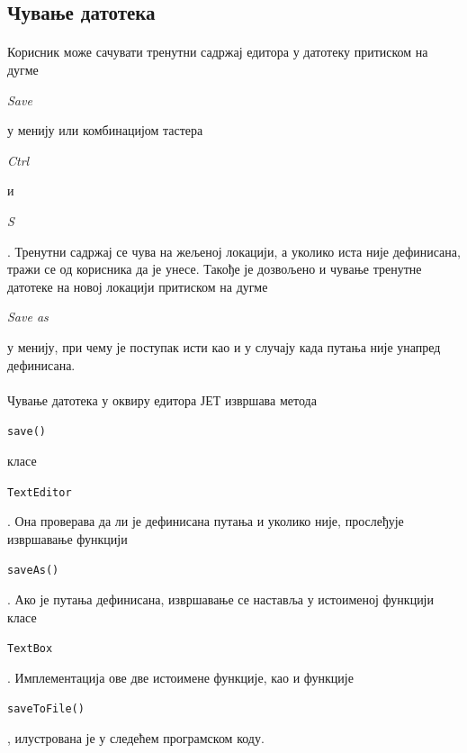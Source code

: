 \documentclass[12pt,oneside]{memoir}
\begin{document}
\subsection{Чување датотека}
\paragraph{}
Корисник може сачувати тренутни садржај едитора у датотеку притиском на дугме 
\begin{latinica}\textit{Save}\end{latinica} у менију или комбинацијом
тастера \begin{latinica}\textit{Ctrl}\end{latinica} и
\begin{latinica}\textit{S}\end{latinica}. Тренутни садржај се чува на 
жељеној локацији, а уколико иста није дефинисана, тражи се од корисника
да је унесе. Такође је дозвољено и чување тренутне датотеке на новој локацији
притиском на дугме \begin{latinica}\textit{Save as}\end{latinica} у менију, при
чему је поступак исти као и у случају када путања није унапред дефинисана.

\paragraph{}
Чување датотека у оквиру едитора ЈЕТ извршава метода
\begin{latinica}\verb|save()|\end{latinica} класе \begin{latinica}\verb|TextEditor|\end{latinica}. Она проверава да ли је дефинисана 
путања и уколико није, прослеђује извршавање функцији \begin{latinica}\verb|saveAs()|\end{latinica}. Ако је путања дефинисана, извршавање
се наставља у истоименој функцији класе  \begin{latinica}\verb|TextBox|\end{latinica}.
Имплементација ове две истоимене функције, као и функције \begin{latinica}\verb|saveToFile()|\end{latinica}, илустрована је у следећем програмском коду.
\end{document}
